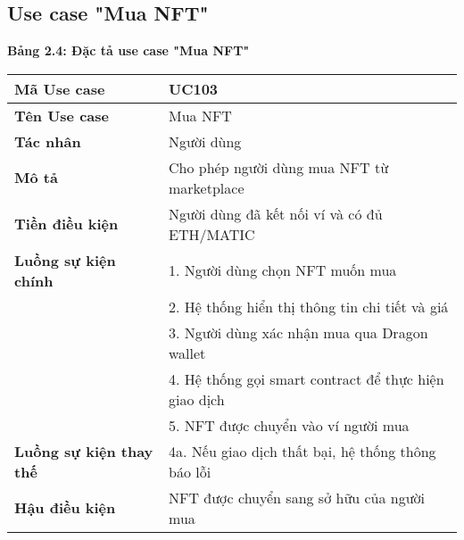 \subsection{Use case "Mua NFT"}
\textbf{Bảng 2.4: Đặc tả use case "Mua NFT"}
\renewcommand{\arraystretch}{1.5}
\begin{tabular}{|l|p{10cm}|}
    \hline
    \rule{0pt}{3ex}\textbf{Mã Use case} & UC103 \\
    \hline
    \rule{0pt}{3ex}\textbf{Tên Use case} & Mua NFT \\
    \hline
    \rule{0pt}{3ex}\textbf{Tác nhân} & Người dùng \\
    \hline
    \rule{0pt}{3ex}\textbf{Mô tả} & Cho phép người dùng mua NFT từ marketplace \\
    \hline
    \rule{0pt}{3ex}\textbf{Tiền điều kiện} & Người dùng đã kết nối ví và có đủ ETH/MATIC \\
    \hline
    \rule{0pt}{3ex}\textbf{Luồng sự kiện chính} & 1. Người dùng chọn NFT muốn mua \\
    & 2. Hệ thống hiển thị thông tin chi tiết và giá \\
    & 3. Người dùng xác nhận mua qua Dragon wallet \\
    & 4. Hệ thống gọi smart contract để thực hiện giao dịch \\
    & 5. NFT được chuyển vào ví người mua \\
    \hline
    \rule{0pt}{3ex}\textbf{Luồng sự kiện thay thế} & 4a. Nếu giao dịch thất bại, hệ thống thông báo lỗi \\
    \hline
    \rule{0pt}{3ex}\textbf{Hậu điều kiện} & NFT được chuyển sang sở hữu của người mua \\
    \hline
\end{tabular}

